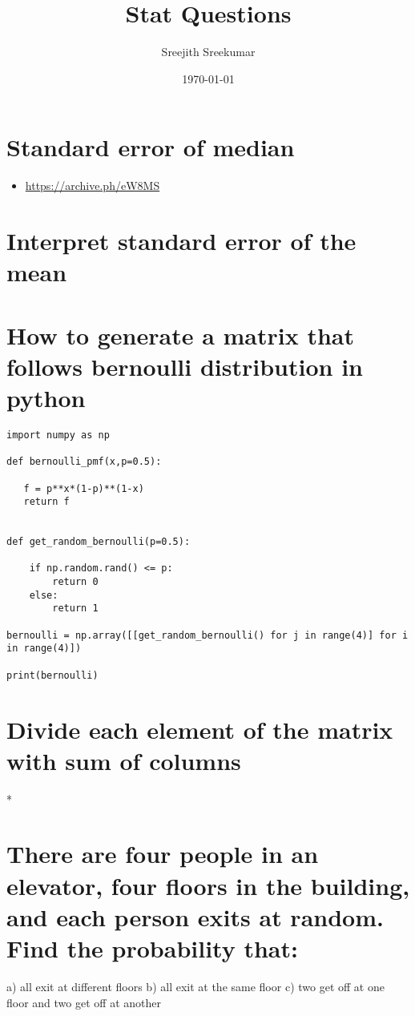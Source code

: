 \documentclass[11pt]{article}
\author{Sreejith Sreekumar}
\date{\today}
\title{Stat Questions}
\begin{document}
\maketitle
\tableofcontents



\section{Standard error of median}
\label{sec:org21157ce}
\begin{itemize}
\item \url{https://archive.ph/eW8MS}
\end{itemize}
\section{Interpret standard error of the mean}
\label{sec:org2aa3227}
\section{How to generate a matrix that follows bernoulli distribution in python}
\label{sec:org93c4450}

\begin{verbatim}
import numpy as np

def bernoulli_pmf(x,p=0.5):

   f = p**x*(1-p)**(1-x)
   return f


def get_random_bernoulli(p=0.5):

    if np.random.rand() <= p:
        return 0
    else:
        return 1

bernoulli = np.array([[get_random_bernoulli() for j in range(4)] for i in range(4)])

print(bernoulli)

\end{verbatim}

\section{Divide each element of the matrix with sum of columns}
\label{sec:orga9ac805}
*

\section{There are four people in an elevator, four floors in the building, and each person exits at random. Find the probability that:}
\label{sec:orgec95656}
a) all exit at different floors
b) all exit at the same floor
c) two get off at one floor and two get off at another
\end{document}
